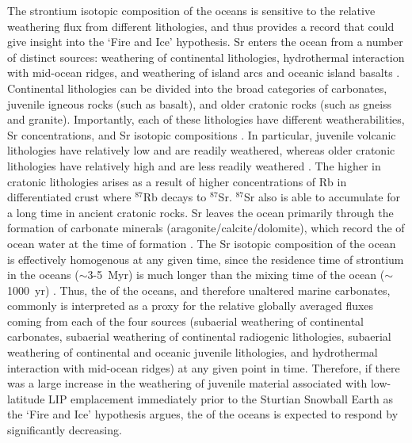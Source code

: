 The strontium isotopic composition of the oceans is sensitive to the relative weathering flux from different lithologies, and thus provides a record that could give insight into the `Fire and Ice' hypothesis. Sr enters the ocean from a number of distinct sources: weathering of continental lithologies, hydrothermal interaction with mid-ocean ridges, and weathering of island arcs and oceanic island basalts \citep{Richter1992a}. Continental lithologies can be divided into the broad categories of carbonates, juvenile igneous rocks (such as basalt), and older cratonic rocks (such as gneiss and granite). Importantly, each of these lithologies have different weatherabilities, Sr concentrations, and Sr isotopic compositions \citep{Allegre2010a}. In particular, juvenile volcanic lithologies have relatively low \SrSr and are readily weathered, whereas older cratonic lithologies have relatively high \SrSr and are less readily weathered \citep{Dessert2003a}. The higher \SrSr in cratonic lithologies arises as a result of higher concentrations of Rb in differentiated crust where $^{87}$Rb decays to $^{87}$Sr. $^{87}$Sr also is able to accumulate for a long time in ancient cratonic rocks. Sr leaves the ocean primarily through the formation of carbonate minerals (aragonite/calcite/dolomite), which record the \SrSr of ocean water at the time of formation \citep{Brand2004a}. The Sr isotopic composition of the ocean is effectively homogenous at any given time, since the residence time of strontium in the oceans ($\sim$3-5~Myr) is much longer than the mixing time of the ocean ($\sim$1000~yr) \citep{Broecker1982a}. Thus, the \SrSr of the oceans, and therefore unaltered marine carbonates, commonly is interpreted as a proxy for the relative globally averaged fluxes coming from each of the four sources (subaerial weathering of continental carbonates, subaerial weathering of continental radiogenic lithologies, subaerial weathering of continental and oceanic juvenile lithologies, and hydrothermal interaction with mid-ocean ridges) at any given point in time. Therefore, if there was a large increase in the weathering of juvenile material associated with low-latitude LIP emplacement immediately prior to the Sturtian Snowball Earth as the `Fire and Ice' hypothesis argues, the \SrSr of the oceans is expected to respond by significantly decreasing.

